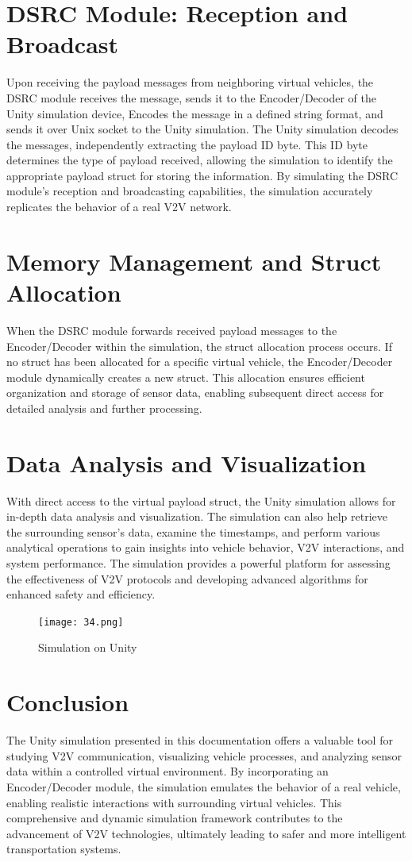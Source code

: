 \documentclass[
12pt,
oneside, 
onehalfspacing, 
nolistspacing, 
parskip, 
chapterinoneline, 
]{AASTCOMPUTER}
\begin{document}
\section{DSRC Module: Reception and Broadcast}
Upon receiving the payload messages from neighboring virtual vehicles, the DSRC \cite{kenney2011dedicated} module receives the message, sends it to the Encoder/Decoder of the Unity simulation device, Encodes the message in a defined string format, and sends it over Unix socket to the Unity simulation. The Unity simulation decodes the messages, independently extracting the payload ID byte. This ID byte determines the type of payload received, allowing the simulation to identify the appropriate payload struct for storing the information. By simulating the DSRC module's reception and broadcasting capabilities, the simulation accurately replicates the behavior of a real V2V network.

\section{Memory Management and Struct Allocation}
When the DSRC module forwards received payload messages to the Encoder/Decoder within the simulation, the struct allocation process occurs. If no struct has been allocated for a specific virtual vehicle, the Encoder/Decoder module dynamically creates a new struct. This allocation ensures efficient organization and storage of sensor data, enabling subsequent direct access for detailed analysis and further processing.

\section{Data Analysis and Visualization}
With direct access to the virtual payload struct, the Unity simulation allows for in-depth data analysis and visualization. The simulation can also help retrieve the surrounding sensor's data, examine the timestamps, and perform various analytical operations to gain insights into vehicle behavior, V2V interactions, and system performance. The simulation provides a powerful platform for assessing the effectiveness of V2V protocols and developing advanced algorithms for enhanced safety and efficiency.

\clearpage
\begin{figure}[!ht]
\centering
\texttt{[image: 34.png]}
\caption[Simulation]{Simulation on Unity}
\label{fig:Simulation}
\end{figure}
\section{Conclusion}
The Unity simulation presented in this documentation offers a valuable tool for studying V2V communication, visualizing vehicle processes, and analyzing sensor data within a controlled virtual environment. By incorporating an Encoder/Decoder module, the simulation emulates the behavior of a real vehicle, enabling realistic interactions with surrounding virtual vehicles. This comprehensive and dynamic simulation framework contributes to the advancement of V2V technologies, ultimately leading to safer and more intelligent transportation systems.
\end{document}
